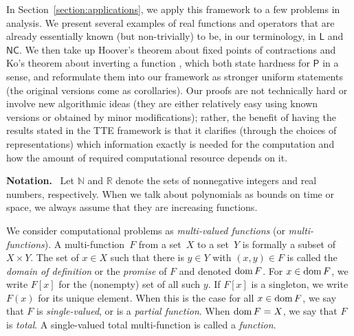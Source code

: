 \documentclass[conference]{IEEEtran}
\newcommand{\R}{\mathbb R}
\newcommand{\N}{\mathbb N}
\newcommand{\classonefont}[1]{\mathsf{#1}}
\newcommand{\classL}{\classonefont{L}}
\newcommand{\classP}{\classonefont{P}}
\newcommand{\classNC}{\classonefont{NC}}
\newcommand{\classtwofont}[1]{\text{\bfseries \sffamily \upshape #1}}
\newcommand{\classLtwo}{\classtwofont{L}}
\newcommand{\classPtwo}{\classtwofont{P}}
\newcommand{\dom}{\mathop{\rm dom}}
\theoremstyle{definition}
\theoremstyle{remark}
\begin{document}
In Section~\ref{section:applications}, 
we apply this framework to a few problems in analysis.
We present several examples of real functions and operators 
that are already essentially known (but non-trivially) to be, 
in our terminology, 
in $\classL$ and $\classNC$. 
We then take up
Hoover's theorem about fixed points of contractions \cite{hoover1991real}
and Ko's theorem about inverting a function \cite{ko1991complexity}, 
which both state hardness for $\classP$ in a sense, 
and reformulate them into our framework
as stronger uniform statements (the original versions come as corollaries).
Our proofs are not technically hard or involve new algorithmic ideas 
(they are either relatively easy using known versions or 
obtained by minor modifications); 
rather, the benefit of having the results stated in the TTE framework 
is that it clarifies (through the choices of representations) 
which information exactly is needed for the computation
and how the amount of required computational resource depends on it. 


\smallskip

\noindent\textbf{Notation.} \ 
Let $\N$ and $\R$ denote the sets of nonnegative integers and 
real numbers, respectively.
When we talk about polynomials as bounds on time or space, 
we always assume that they are increasing functions. 

We consider computational problems as 
\emph{multi-valued functions} (or {\em multi-functions}). 
A multi-function~$F$ from a set~$X$ to a set~$Y$
is formally a subset of $X \times Y$. 
The set of $x \in X$ such that 
there is $y \in Y$ with $(x, y) \in F$ 
is called the 
\emph{domain of definition} 
or the 
\emph{promise} 
of $F$ and denoted 
$\dom F$. 
For $x \in \dom F$, 
we write 
$F [x]$ for the (nonempty) set of all such $y$. 
If $F [x]$ is a singleton, 
we write 
$F (x)$ for its unique element. 
When this is the case for all $x \in \dom F$, 
we say that $F$ is 
\emph{single-valued}, 
or is a 
\emph{partial function}. 
When $\dom F = X$, 
we say that $F$ is 
\emph{total}. 
A single-valued total multi-function is called a 
\emph{function}. 
\end{document}
